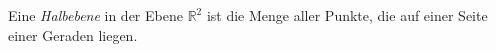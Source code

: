 \begin{definition}
%
    Eine \emph{Halbebene} in der Ebene $\mathbb{R}^2$ ist die Menge aller Punkte, die auf einer Seite einer Geraden liegen.

\end{definition}
